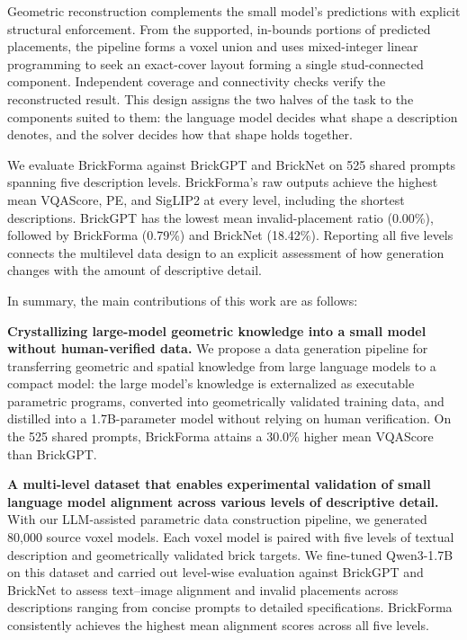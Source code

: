 Geometric reconstruction complements the small model's predictions with explicit structural enforcement. From the supported, in-bounds portions of predicted placements, the pipeline forms a voxel union and uses mixed-integer linear programming to seek an exact-cover layout forming a single stud-connected component. Independent coverage and connectivity checks verify the reconstructed result. This design assigns the two halves of the task to the components suited to them: the language model decides what shape a description denotes, and the solver decides how that shape holds together.

We evaluate BrickForma against BrickGPT and BrickNet on 525 shared prompts spanning five description levels. BrickForma's raw outputs achieve the highest mean VQAScore, PE, and SigLIP2 at every level, including the shortest descriptions. BrickGPT has the lowest mean invalid-placement ratio (0.00\%), followed by BrickForma (0.79\%) and BrickNet (18.42\%). Reporting all five levels connects the multilevel data design to an explicit assessment of how generation changes with the amount of descriptive detail.

In summary, the main contributions of this work are as follows:

\textbf{Crystallizing large-model geometric knowledge into a small model 
without human-verified data.}
We propose a data generation pipeline for transferring geometric and 
spatial knowledge from large language models to a compact model: the 
large model's knowledge is externalized as executable parametric programs, 
converted into geometrically validated training data, and distilled into 
a 1.7B-parameter model without relying on human verification. 
On the 525 shared prompts, BrickForma attains a 30.0\% higher mean VQAScore
than BrickGPT.



\textbf{A multi-level dataset that enables experimental validation of small language model alignment across 
various levels of descriptive detail.}
With our LLM-assisted parametric data construction pipeline, we generated 80,000 
source voxel models. Each voxel model is paired with five levels of textual description 
and geometrically validated brick targets. We fine-tuned Qwen3-1.7B on this dataset and carried out level-wise evaluation 
against BrickGPT and BrickNet to assess text--image alignment and invalid 
placements across descriptions ranging from concise prompts to detailed 
specifications. BrickForma consistently achieves the highest mean 
alignment scores across all five levels.